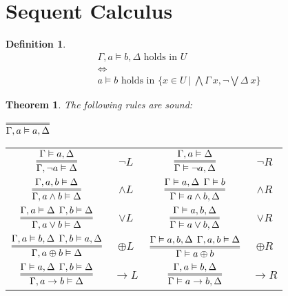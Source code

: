 \documentclass{article}
\theoremstyle{sltheorem}
\newtheorem{definition}{Definition}
\newtheorem{theorem}{Theorem}
\begin{document}
\section{Sequent Calculus}
\begin{definition}
    \begin{gather*}
       \Gamma,a\vDash b,\Delta\text{ holds in }U\\
       \Leftrightarrow\\
       a\vDash b\text{ holds in }\{x\in U\:|\:\bigwedge\Gamma\:x, \neg\bigvee\Delta\:x\}
    \end{gather*}
\end{definition}
\begin{theorem}
    The following rules are sound:
    \begin{center}
        $\infer={\Gamma, a \vDash a, \Delta}{}$\\
    {\renewcommand{\arraystretch}{3}
    \begin{tabular}{c c c c}
           $\vcenter{\infer={\Gamma,\neg a\vDash \Delta}{\Gamma\vDash a, \Delta}}$ 
           &$\neg L$
           &$\vcenter{\infer={\Gamma\vDash \neg a, \Delta}{\Gamma, a\vDash \Delta}}$ 
           &$\neg R$\\
           $\vcenter{\infer={\Gamma, a\wedge b\vDash \Delta}{\Gamma, a, b\vDash \Delta}}$ 
           &$\wedge L$
           &$\vcenter{\infer={\Gamma\vDash a\wedge b, \Delta}{\Gamma\vDash a, \Delta\:\: \Gamma\vDash b}}$ 
           &$\wedge R$\\
           $\vcenter{\infer={\Gamma, a\vee b\vDash \Delta}{\Gamma,a\vDash \Delta\:\:\Gamma,b\vDash\Delta}}$ 
           &$\vee L$
           &$\vcenter{\infer={\Gamma\vDash a\vee b,\Delta}{\Gamma\vDash a,b,\Delta}}$ 
           &$\vee R$\\
           $\vcenter{\infer={\Gamma, a\oplus b\vDash\Delta}{\Gamma, a\vDash b, \Delta\:\:\Gamma, b\vDash a,\Delta}}$
           &$\oplus L$
           &$\vcenter{\infer={\Gamma\vDash a\oplus b}{\Gamma\vDash a,b,\Delta\:\:\Gamma,a,b\vDash \Delta}}$
           &$\oplus R$\\
           $\vcenter{\infer={\Gamma, a\to b\vDash \Delta}{\Gamma\vDash a,\Delta\:\:\Gamma, b\vDash \Delta}}$
           &$\to L$
           &$\vcenter{\infer={\Gamma\vDash a\to b, \Delta}{\Gamma,a\vDash b,\Delta}}$
           &$\to R$
    \end{tabular}
    }
    \end{center}
\end{theorem}
\end{document}
